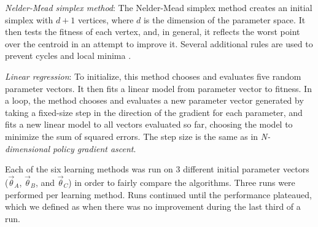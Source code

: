 
\emph{Nelder-Mead simplex method}: The Nelder-Mead simplex
  method \cite{nm} creates an initial simplex with $d+1$ vertices,
  where $d$ is the dimension of the parameter space. It then tests the
  fitness of each vertex, and, in general, it reflects the worst point
  over the centroid in an attempt to improve it.  Several additional
  rules are used to prevent cycles and local minima \cite{nm}.

\emph{Linear regression}: To initialize, this method chooses and
  evaluates five random parameter vectors. It then fits a linear model
  from parameter vector to fitness. In a loop, the method chooses and
  evaluates a new parameter vector generated by taking a fixed-size
  step in the direction of the gradient for each parameter, and fits a
  new linear model to all vectors evaluated so far, choosing the model
  to minimize the sum of squared errors. The step size is the same as in
  \emph{N-dimensional policy gradient ascent}.


Each of the six learning methods was run on 3 different initial
parameter vectors ($\vec{\theta}_A$,
$\vec{\theta}_B$, and $\vec{\theta}_C$) in order to fairly compare the algorithms. Three runs were performed per learning method. Runs continued until the performance plateaued, which we defined as when there was no improvement during the last third of
a run.

